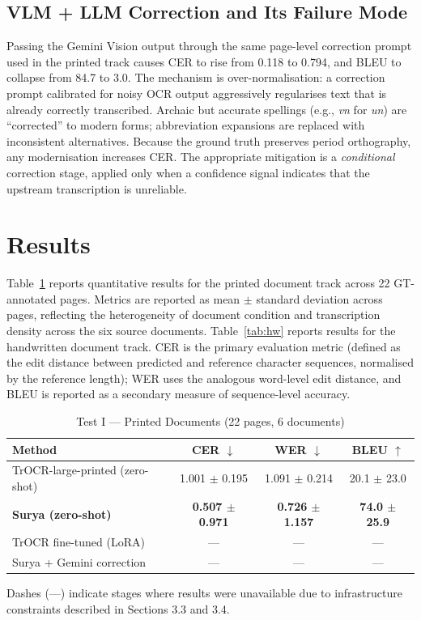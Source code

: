 \documentclass[11pt,a4paper]{article}
\begin{document}
\subsection{VLM + LLM Correction and Its Failure Mode}

Passing the Gemini Vision output through the same page-level correction prompt used in the
printed track causes CER to rise from 0.118 to 0.794, and BLEU to collapse from 84.7 to
3.0. The mechanism is over-normalisation: a correction prompt calibrated for noisy OCR
output aggressively regularises text that is already correctly transcribed. Archaic but
accurate spellings (e.g., \textit{vn} for \textit{un}) are ``corrected'' to modern forms;
abbreviation expansions are replaced with inconsistent alternatives. Because the ground
truth preserves period orthography, any modernisation increases CER. The appropriate
mitigation is a \emph{conditional} correction stage, applied only when a confidence signal
indicates that the upstream transcription is unreliable.

\section{Results}

Table~\ref{tab:print} reports quantitative results for the printed document track across
22 GT-annotated pages. Metrics are reported as mean $\pm$ standard deviation across pages,
reflecting the heterogeneity of document condition and transcription density across the
six source documents. Table~\ref{tab:hw} reports results for the handwritten document track.
CER is the primary evaluation metric (defined as the edit distance between predicted and reference
character sequences, normalised by the reference length); WER uses the analogous word-level edit distance,
and BLEU is reported as a secondary measure of sequence-level accuracy.

\begin{table}[ht]
\centering
\caption{Test I --- Printed Documents (22 pages, 6 documents)}
\label{tab:print}
\begin{tabular}{lccc}
\toprule
\textbf{Method} & \textbf{CER} $\downarrow$ & \textbf{WER} $\downarrow$ & \textbf{BLEU} $\uparrow$ \\
\midrule
TrOCR-large-printed (zero-shot)   & 1.001 $\pm$ 0.195  & 1.091 $\pm$ 0.214  & 20.1 $\pm$ 23.0 \\
\rowcolor{lightgray}
\textbf{Surya (zero-shot)}        & \textbf{0.507 $\pm$ 0.971} & \textbf{0.726 $\pm$ 1.157} & \textbf{74.0 $\pm$ 25.9} \\
TrOCR fine-tuned (LoRA)           & ---                & ---                & ---             \\
Surya + Gemini correction         & ---                & ---                & ---             \\
\bottomrule
\end{tabular}
\medskip
\small{Dashes (---) indicate stages where results were unavailable due to infrastructure
constraints described in Sections 3.3 and 3.4.}
\end{table}
\end{document}

